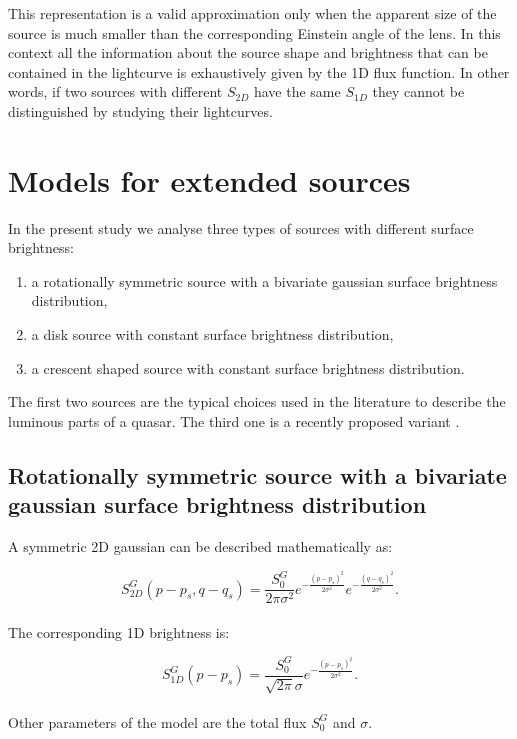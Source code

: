 \documentclass[usenatbib]{mn2e}
\begin{document}
This representation is a valid approximation only when the apparent size of the source is much smaller than the corresponding Einstein angle of the lens. In this context 
all the information about the source shape and brightness that can be contained in the lightcurve is exhaustively given by the 1D flux function.
In other words, if two sources with different $S_{2D}$ have the same $S_{1D}$ they cannot be distinguished by studying their lightcurves.
 
 
\section{Models for extended sources}\label{sec:source-models}

In the present study we analyse three types of sources with different surface brightness: 
\begin{enumerate}
 \renewcommand{\theenumi}{(\arabic{enumi})}
  \item a rotationally symmetric source with a bivariate gaussian surface brightness distribution,
  \item a disk source with constant surface brightness distribution,
  \item a crescent shaped source with constant surface brightness distribution.
\end{enumerate}
The first two sources are the typical choices used in the literature to describe the luminous parts of a quasar. 
The third one is a recently proposed variant \citep{2013MNRAS.434..765K}.




\subsection{Rotationally symmetric source with a bivariate gaussian surface brightness distribution}\label{subsec:gaussian}

A symmetric 2D gaussian can be described mathematically as:

\begin{equation}
 S_{2D}^G(p-p_s, q-q_s) = \frac{S_0^G}{2 \pi \sigma^2} e^{-\frac{(p-p_s)^2}{2 \sigma^2}} e^{-\frac{(q-q_s)^2}{2 \sigma^2}}.
\end{equation}
\\
The corresponding 1D brightness is:

\begin{equation}
 S_{1D}^G(p-p_s) = \frac{S_0^G}{\sqrt{2 \pi} \sigma} e^{-\frac{(p-p_s)^2}{2 \sigma^2}}.
\end{equation}
\\
Other parameters of the model are the total flux $S_0^G$ and $\sigma$. 
\end{document}
